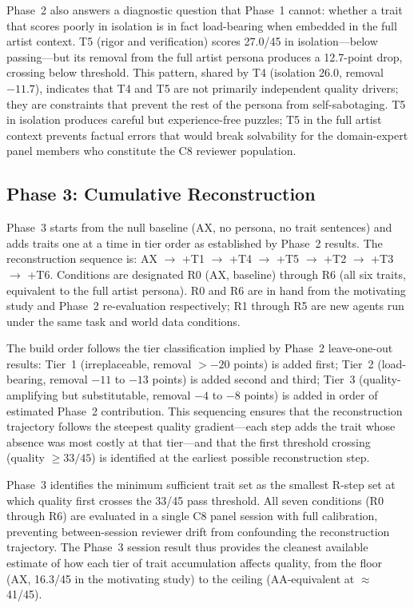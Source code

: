 Phase~2 also answers a diagnostic question that Phase~1 cannot: whether a trait that scores poorly in isolation is in fact load-bearing when embedded in the full artist context. T5 (rigor and verification) scores 27.0/45 in isolation---below passing---but its removal from the full artist persona produces a 12.7-point drop, crossing below threshold. This pattern, shared by T4 (isolation 26.0, removal $-11.7$), indicates that T4 and T5 are not primarily independent quality drivers; they are constraints that prevent the rest of the persona from self-sabotaging. T5 in isolation produces careful but experience-free puzzles; T5 in the full artist context prevents factual errors that would break solvability for the domain-expert panel members who constitute the C8 reviewer population.

\subsection{Phase 3: Cumulative Reconstruction}

Phase~3 starts from the null baseline (AX, no persona, no trait sentences) and adds traits one at a time in tier order as established by Phase~2 results. The reconstruction sequence is: AX $\to$ +T1 $\to$ +T4 $\to$ +T5 $\to$ +T2 $\to$ +T3 $\to$ +T6. Conditions are designated R0 (AX, baseline) through R6 (all six traits, equivalent to the full artist persona). R0 and R6 are in hand from the motivating study and Phase~2 re-evaluation respectively; R1 through R5 are new agents run under the same task and world data conditions.

The build order follows the tier classification implied by Phase~2 leave-one-out results: Tier~1 (irreplaceable, removal $> -20$ points) is added first; Tier~2 (load-bearing, removal $-11$ to $-13$ points) is added second and third; Tier~3 (quality-amplifying but substitutable, removal $-4$ to $-8$ points) is added in order of estimated Phase~2 contribution. This sequencing ensures that the reconstruction trajectory follows the steepest quality gradient---each step adds the trait whose absence was most costly at that tier---and that the first threshold crossing (quality $\geq 33/45$) is identified at the earliest possible reconstruction step.

Phase~3 identifies the minimum sufficient trait set as the smallest R-step set at which quality first crosses the 33/45 pass threshold. All seven conditions (R0 through R6) are evaluated in a single C8 panel session with full calibration, preventing between-session reviewer drift from confounding the reconstruction trajectory. The Phase~3 session result thus provides the cleanest available estimate of how each tier of trait accumulation affects quality, from the floor (AX, 16.3/45 in the motivating study) to the ceiling (AA-equivalent at $\approx$ 41/45).

